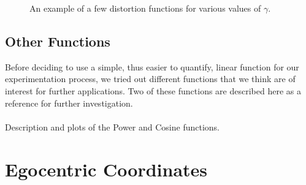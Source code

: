 \begin{figure}[h]
    \caption{An example of a few distortion functions for various values of $\gamma $.}\label{fig:plotsOfGamma}
\end{figure}

\subsection*{Other Functions}

Before deciding to use a simple, thus easier to quantify, linear function for our experimentation process, we tried out different functions that we think are of interest for further applications. Two of these functions are described here as a reference for further investigation.
\\\\
Description and plots of the Power and Cosine functions.

\section{Egocentric Coordinates}

